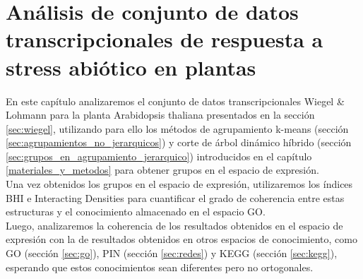 \chapter{Análisis de conjunto de datos transcripcionales de respuesta a stress abiótico en plantas}
En este capítulo analizaremos el conjunto de datos transcripcionales Wiegel \& Lohmann para la planta Arabidopsis thaliana presentados en la sección \ref{sec:wiegel}, utilizando para ello los métodos de agrupamiento k-means (sección \ref{sec:agrupamientos_no_jerarquicos}) y corte de árbol dinámico híbrido (sección \ref{sec:grupos_en_agrupamiento_jerarquico}) introducidos en el capítulo \ref{materiales_y_metodos} para obtener grupos en el espacio de expresión.\\
Una vez obtenidos los grupos en el espacio de expresión, utilizaremos los índices BHI e Interacting Densities para cuantificar el grado de coherencia entre estas estructuras y el conocimiento almacenado en el espacio GO.\\
Luego, analizaremos la coherencia de los resultados obtenidos en el espacio de expresión con la de resultados obtenidos en otros espacios de conocimiento, como GO (sección \ref{sec:go}), PIN  (sección \ref{sec:redes}) y KEGG (sección \ref{sec:kegg}), esperando que estos conocimientos sean diferentes pero no ortogonales. 

